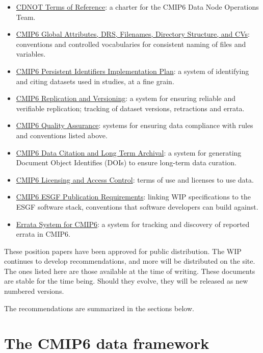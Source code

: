 \documentclass[gmd,manuscript]{copernicus}
\begin{document}
\begin{itemize}
\item \href{https://goo.gl/Z9yHnE}{CDNOT Terms of Reference}: a
  charter for the CMIP6 Data Node Operations Team.
\item \href{https://goo.gl/cMiPE7}{CMIP6 Global Attributes, DRS,
    Filenames, Directory Structure, and CVs}: conventions and
  controlled vocabularies for consistent naming of files and variables.
\item \href{https://goo.gl/dQAEDy}{CMIP6 Persistent Identifiers
    Implementation Plan}: a system of identifying and citing datasets
  used in studies, at a fine grain.
\item \href{https://goo.gl/jqWjQ5}{CMIP6 Replication and Versioning}:
  a system for ensuring reliable and verifiable replication; tracking
  of dataset versions, retractions and errata.
\item \href{https://goo.gl/vKmGM4}{CMIP6 Quality Assurance}: systems
  for ensuring data compliance with rules and conventions listed
  above.
\item \href{https://goo.gl/CZyWq1}{CMIP6 Data Citation and Long Term
    Archival}: a system for generating Document Object Identifies
  (DOIs) to ensure long-term data curation.
\item \href{https://goo.gl/h4HSP1}{CMIP6 Licensing and Access
    Control}: terms of use and licenses to use data.
\item \href{https://goo.gl/Ro97Rv}{CMIP6 ESGF Publication
    Requirements}: linking WIP specifications to the ESGF software
  stack, conventions that software developers can build against.
\item \href{https://goo.gl/qjs8WK}{Errata System for CMIP6}: a system
  for tracking and discovery of reported errata in CMIP6.
\end{itemize}

These position papers have been approved for public distribution. The
WIP continues to develop recommendations, and more will be distributed
on the site. The ones listed here are those available at the time of
writing. These documents are stable for the time being. Should they
evolve, they will be released as new numbered versions.

The recommendations are summarized in the sections below.

\section{The CMIP6 data framework}
\label{sec:dreq}
\end{document}
